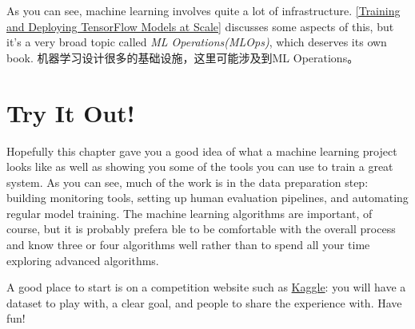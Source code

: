 As you can see, machine learning involves quite a lot of infrastructure. \autoref{Training and Deploying TensorFlow Models at Scale}  discusses some aspects of this, but it's a very broad topic called \emph{ML Operations(MLOps)}, which deserves its own book. 机器学习设计很多的基础设施，这里可能涉及到ML Operations。
\section{Try It Out!}
Hopefully this chapter gave you a good idea of what a machine learning project looks like as well as showing you some of the tools you can use to train a great system. As you can see, much of the work is in the data preparation step: building monitoring tools, setting up human evaluation pipelines, and automating regular model training. The machine learning algorithms are important, of course, but it is probably prefera ble to be comfortable with the overall process and know three or four algorithms well rather than to spend all your time exploring advanced algorithms.

A good place to start is on a competition website such as \href{https://www.kaggle.com/}{Kaggle}: you will have a dataset to play with, a clear goal, and people to share the experience with. Have fun!
